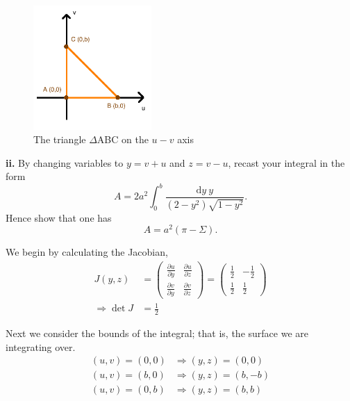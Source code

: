 \documentclass[a4paper]{article} %
\newcommand{\pmx}[1]{\begin{pmatrix}#1\end{pmatrix}}
\begin{document}
\begin{figure}[h]
\centering
\includegraphics[width=0.4\textwidth]{images/fi.png}
\caption{The triangle $\Delta$ABC on the $u-v$ axis}
\label{fi figure}
\end{figure}


\pagebreak  %

\begin{framed}
\textbf{ii.} By changing variables to $y=v+u$ and $z=v-u$, recast your integral in the form
\begin{equation}
A=2a^2\int^b_0 \frac{\text{d}y~y}{(2-y^2)\sqrt{1-y^2}}.
\end{equation}
Hence show that one has
\begin{equation}
A=a^2(\pi-\Sigma).\label{A(pi,Sigma)}
\end{equation}
\end{framed}

We begin by calculating the Jacobian,
\begin{align}
J(y,z)&=\pmx{\frac{\partial u}{\partial y}&\frac{\partial u}{\partial z}\\
\frac{\partial v}{\partial y}&\frac{\partial v}{\partial z}}=\pmx{\frac{1}{2}&-\frac{1}{2}\\\frac{1}{2}&\frac{1}{2}}\\
\Rightarrow \det J&=\frac{1}{2}
\end{align}

Next we consider the bounds of the integral; that is, the surface we are integrating over.
\begin{align}
(u,v)=(0,0)&\Rightarrow (y,z)=(0,0)\\
(u,v)=(b,0)&\Rightarrow (y,z)=(b,-b)\\
(u,v)=(0,b)&\Rightarrow (y,z)=(b,b)
\end{align}
\end{document}
